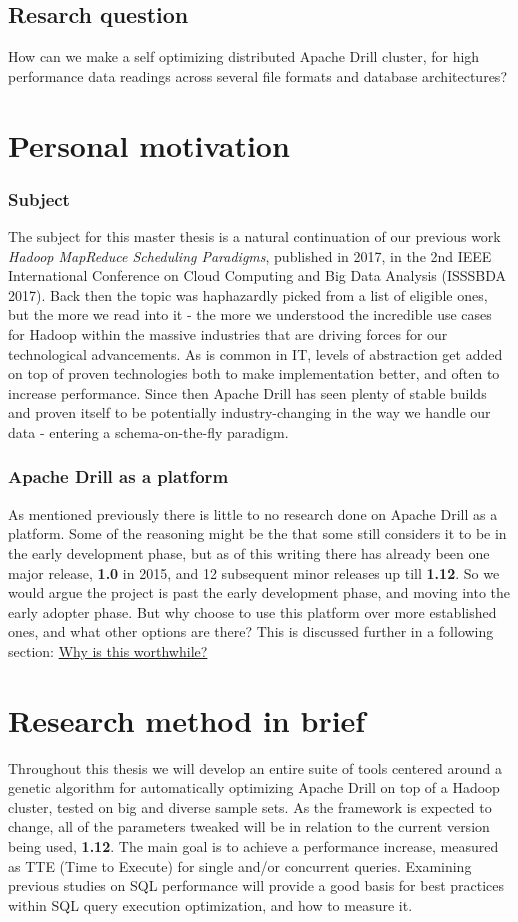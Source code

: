 \documentclass[a4paper,english]{report}
\begin{document}
		\subsection{Resarch question}
		How can we make a self optimizing distributed Apache Drill cluster, for high performance data readings across several file formats and database architectures?
		
		\section{Personal motivation}
			\subsubsection{Subject}
			The subject for this master thesis is a natural continuation of our previous work \emph{Hadoop MapReduce Scheduling Paradigms}, published in 2017, in the 2nd IEEE International Conference on Cloud Computing and Big Data Analysis (ISSSBDA 2017). Back then the topic was haphazardly picked from a list of eligible ones, but the more we read into it - the more we understood the incredible use cases for Hadoop within the massive industries that are driving forces for our technological advancements. As is common in IT, levels of abstraction get added on top of proven technologies both to make implementation better, and often to increase performance. Since then Apache Drill has seen plenty of stable builds and proven itself to be potentially industry-changing in the way we handle our data - entering a schema-on-the-fly paradigm.
			\subsubsection{Apache Drill as a platform}
			As mentioned previously there is little to no research done on Apache Drill as a platform. Some of the reasoning might be the that some still considers it to be in the early development phase, but as of this writing there has already been one major release, \textbf{1.0} in 2015, and 12 subsequent minor releases up till \textbf{1.12}\cite{drill_releases}. So we would argue the project is past the early development phase, and moving into the early adopter phase. But why choose to use this platform over more established ones, and what other options are there? This is discussed further in a following section: \hyperref[sec:why_drill]{Why is this worthwhile?}
		
		\section{Research method in brief}
		Throughout this thesis we will develop an entire suite of tools centered around a genetic algorithm for automatically optimizing Apache Drill on top of a Hadoop cluster, tested on big and diverse sample sets. As the framework is expected to change, all of the parameters tweaked will be in relation to the current version being used, \textbf{1.12}. The main goal is to achieve a performance increase, measured as TTE (Time to Execute) for single and/or concurrent queries. Examining previous studies on SQL performance will provide a good basis for best practices within SQL query execution optimization, and how to measure it.
		
\end{document}
